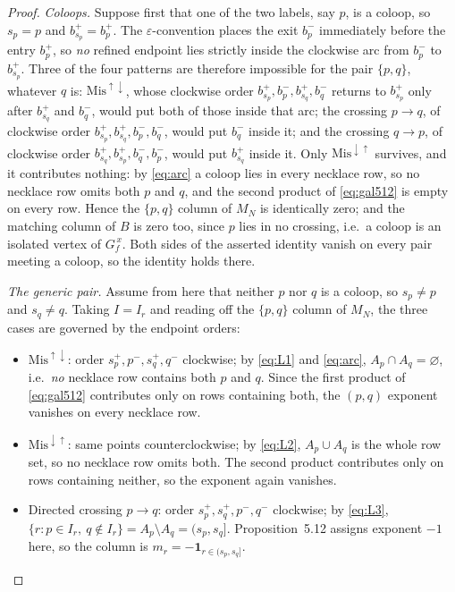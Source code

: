 \documentclass[11pt]{article}
\theoremstyle{definition}
\begin{document}
\begin{proof}
\emph{Coloops.} Suppose first that one of the two labels, say $p$, is a coloop, so $s_p=p$ and
$b^+_{s_p}=b^+_p$. The $\varepsilon$-convention places the exit $b^-_p$ immediately before the entry
$b^+_p$, so \emph{no} refined endpoint lies strictly inside the clockwise arc from $b^-_p$ to
$b^+_{s_p}$. Three of the four patterns are therefore impossible for the pair $\{p,q\}$, whatever $q$ is:
$\mathrm{Mis}^{\uparrow\downarrow}$, whose clockwise order $b^+_{s_p},b^-_p,b^+_{s_q},b^-_q$ returns to
$b^+_{s_p}$ only after $b^+_{s_q}$ and $b^-_q$, would put both of those inside that arc; the crossing
$p\to q$, of clockwise order $b^+_{s_p},b^+_{s_q},b^-_p,b^-_q$, would put $b^-_q$ inside it; and the
crossing $q\to p$, of clockwise order $b^+_{s_q},b^+_{s_p},b^-_q,b^-_p$, would put $b^+_{s_q}$ inside it.
Only $\mathrm{Mis}^{\downarrow\uparrow}$ survives, and it contributes nothing: by \eqref{eq:arc} a coloop
lies in every necklace row, so no necklace row omits both $p$ and $q$, and the second product of
\eqref{eq:gal512} is empty on every row. Hence the $\{p,q\}$ column of $M_N$ is identically zero; and the
matching column of $B$ is zero too, since $p$ lies in no crossing, i.e.\ a coloop is an isolated vertex
of $G_f^{\,x}$. Both sides of the asserted identity vanish on every pair meeting a coloop, so the
identity holds there.

\emph{The generic pair.} Assume from here that neither $p$ nor $q$ is a coloop, so $s_p\ne p$ and
$s_q\ne q$. Taking $I=I_r$ and reading off the $\{p,q\}$ column of $M_N$, the three cases are governed by
the endpoint orders:
\begin{itemize}
\item $\mathrm{Mis}^{\uparrow\downarrow}$: order $s_p^+,p^-,s_q^+,q^-$ clockwise; by \eqref{eq:L1} and
\eqref{eq:arc}, $A_p\cap A_q=\varnothing$, i.e.\ \emph{no} necklace row contains both $p$ and $q$. Since the
first product of \eqref{eq:gal512} contributes only on rows containing both, the $(p,q)$ exponent vanishes
on every necklace row.
\item $\mathrm{Mis}^{\downarrow\uparrow}$: same points counterclockwise; by \eqref{eq:L2},
$A_p\cup A_q$ is the whole row set, so no necklace row omits both. The
second product contributes only on rows containing neither, so the exponent again vanishes.
\item Directed crossing $p\to q$: order $s_p^+,s_q^+,p^-,q^-$ clockwise; by \eqref{eq:L3},
$\{r:p\in I_r,\ q\notin I_r\}=A_p\setminus A_q=(s_p,s_q]$. Proposition~5.12 assigns exponent $-1$ here, so
the column is $m_r=-\mathbf 1_{r\in(s_p,s_q]}$.
\end{itemize}


\end{proof}
\end{document}
